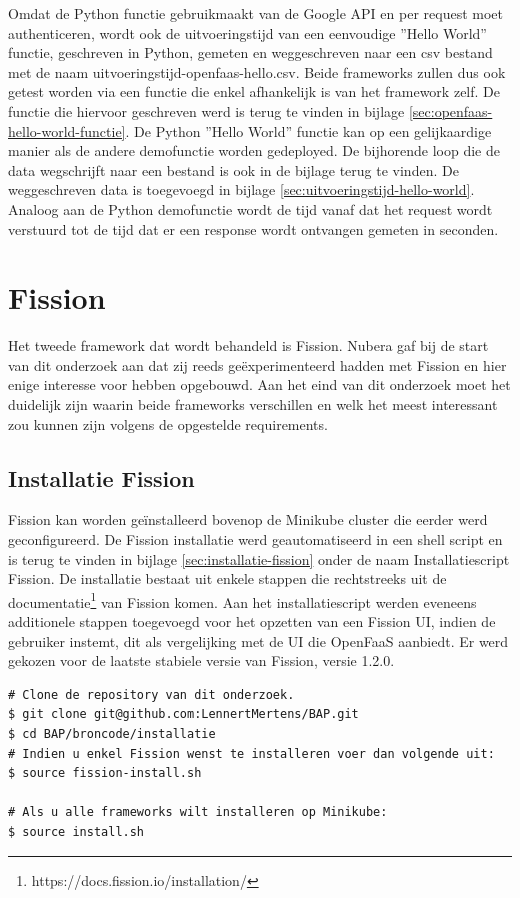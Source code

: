 Omdat de Python functie gebruikmaakt van de Google API en per request moet authenticeren, wordt ook de uitvoeringstijd van een eenvoudige ''Hello World'' functie, geschreven in Python, gemeten en weggeschreven naar een csv bestand met de naam uitvoeringstijd-openfaas-hello.csv. Beide frameworks zullen dus ook getest worden via een functie die enkel afhankelijk is van het framework zelf. De functie die hiervoor geschreven werd is terug te vinden in bijlage \ref{sec:openfaas-hello-world-functie}. De Python ''Hello World'' functie kan op een gelijkaardige manier als de andere demofunctie worden gedeployed. De bijhorende loop die de data wegschrijft naar een bestand is ook in de bijlage terug te vinden. De weggeschreven data is toegevoegd in bijlage \ref{sec:uitvoeringstijd-hello-world}. Analoog aan de Python demofunctie wordt de tijd vanaf dat het request wordt verstuurd tot de tijd dat er een response wordt ontvangen gemeten in seconden.

\newpage
\section{Fission}
Het tweede framework dat wordt behandeld is Fission. Nubera gaf bij de start van dit onderzoek aan dat zij reeds geëxperimenteerd hadden met Fission en hier enige interesse voor hebben opgebouwd. Aan het eind van dit onderzoek moet het duidelijk zijn waarin beide frameworks verschillen en welk het meest interessant zou kunnen zijn volgens de opgestelde requirements.

\subsection{Installatie Fission}
Fission kan worden geïnstalleerd bovenop de Minikube cluster die eerder werd geconfigureerd. De Fission installatie werd geautomatiseerd in een shell script en is terug te vinden in bijlage \ref{sec:installatie-fission} onder de naam Installatiescript Fission. De installatie bestaat uit enkele stappen die rechtstreeks uit de documentatie\footnote{https://docs.fission.io/installation/} van Fission komen. Aan het installatiescript werden eveneens additionele stappen toegevoegd voor het opzetten van een Fission UI, indien de gebruiker instemt, dit als vergelijking met de UI die OpenFaaS aanbiedt. Er werd gekozen voor de laatste stabiele versie van Fission, versie 1.2.0.

\begin{lstlisting}
# Clone de repository van dit onderzoek.
$ git clone git@github.com:LennertMertens/BAP.git
$ cd BAP/broncode/installatie
# Indien u enkel Fission wenst te installeren voer dan volgende uit:
$ source fission-install.sh

# Als u alle frameworks wilt installeren op Minikube:
$ source install.sh
\end{lstlisting}


